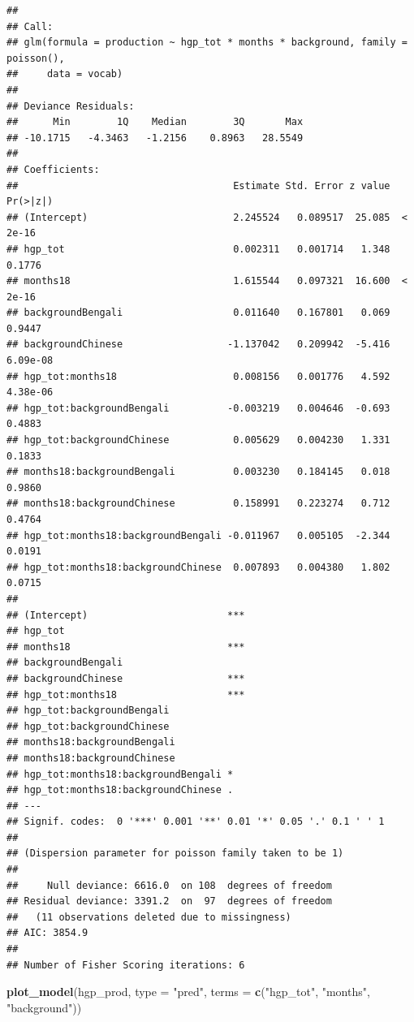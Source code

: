 \documentclass[]{article}
\newenvironment{Shaded}{\begin{snugshade}}{\end{snugshade}}
\newcommand{\DataTypeTok}[1]{\textcolor[rgb]{0.13,0.29,0.53}{#1}}
\newcommand{\KeywordTok}[1]{\textcolor[rgb]{0.13,0.29,0.53}{\textbf{#1}}}
\newcommand{\NormalTok}[1]{#1}
\newcommand{\StringTok}[1]{\textcolor[rgb]{0.31,0.60,0.02}{#1}}
\begin{document}
\begin{verbatim}
## 
## Call:
## glm(formula = production ~ hgp_tot * months * background, family = poisson(), 
##     data = vocab)
## 
## Deviance Residuals: 
##      Min        1Q    Median        3Q       Max  
## -10.1715   -4.3463   -1.2156    0.8963   28.5549  
## 
## Coefficients:
##                                     Estimate Std. Error z value Pr(>|z|)
## (Intercept)                         2.245524   0.089517  25.085  < 2e-16
## hgp_tot                             0.002311   0.001714   1.348   0.1776
## months18                            1.615544   0.097321  16.600  < 2e-16
## backgroundBengali                   0.011640   0.167801   0.069   0.9447
## backgroundChinese                  -1.137042   0.209942  -5.416 6.09e-08
## hgp_tot:months18                    0.008156   0.001776   4.592 4.38e-06
## hgp_tot:backgroundBengali          -0.003219   0.004646  -0.693   0.4883
## hgp_tot:backgroundChinese           0.005629   0.004230   1.331   0.1833
## months18:backgroundBengali          0.003230   0.184145   0.018   0.9860
## months18:backgroundChinese          0.158991   0.223274   0.712   0.4764
## hgp_tot:months18:backgroundBengali -0.011967   0.005105  -2.344   0.0191
## hgp_tot:months18:backgroundChinese  0.007893   0.004380   1.802   0.0715
##                                       
## (Intercept)                        ***
## hgp_tot                               
## months18                           ***
## backgroundBengali                     
## backgroundChinese                  ***
## hgp_tot:months18                   ***
## hgp_tot:backgroundBengali             
## hgp_tot:backgroundChinese             
## months18:backgroundBengali            
## months18:backgroundChinese            
## hgp_tot:months18:backgroundBengali *  
## hgp_tot:months18:backgroundChinese .  
## ---
## Signif. codes:  0 '***' 0.001 '**' 0.01 '*' 0.05 '.' 0.1 ' ' 1
## 
## (Dispersion parameter for poisson family taken to be 1)
## 
##     Null deviance: 6616.0  on 108  degrees of freedom
## Residual deviance: 3391.2  on  97  degrees of freedom
##   (11 observations deleted due to missingness)
## AIC: 3854.9
## 
## Number of Fisher Scoring iterations: 6
\end{verbatim}

\begin{Shaded}
\begin{Highlighting}[]
\KeywordTok{plot_model}\NormalTok{(hgp_prod, }\DataTypeTok{type =} \StringTok{"pred"}\NormalTok{, }\DataTypeTok{terms =} \KeywordTok{c}\NormalTok{(}\StringTok{"hgp_tot"}\NormalTok{, }\StringTok{"months"}\NormalTok{, }\StringTok{"background"}\NormalTok{))}
\end{Highlighting}
\end{Shaded}
\end{document}
